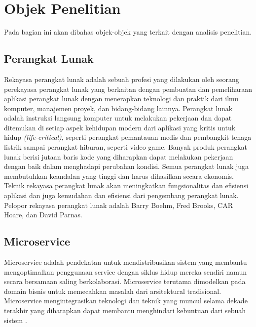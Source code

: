 \section{Objek Penelitian}
Pada bagian ini akan dibahas objek-objek yang terkait dengan analisis penelitian.
\subsection{Perangkat Lunak}
Rekayasa perangkat lunak adalah sebuah profesi yang dilakukan oleh seorang perekayasa perangkat lunak yang berkaitan dengan pembuatan dan pemeliharaan aplikasi perangkat lunak dengan menerapkan teknologi dan praktik dari ilmu komputer, manajemen proyek, dan bidang-bidang lainnya. Perangkat lunak adalah instruksi langsung komputer untuk melakukan pekerjaan dan dapat ditemukan di setiap aspek kehidupan modern dari aplikasi yang kritis untuk hidup \textit{(life-critical)}, seperti perangkat pemantauan medis dan pembangkit tenaga listrik sampai perangkat hiburan, seperti video game. Banyak produk perangkat lunak berisi jutaan baris kode yang diharapkan dapat melakukan pekerjaan dengan baik dalam menghadapi perubahan kondisi. Semua perangkat lunak juga membutuhkan keandalan yang tinggi dan harus dihasilkan secara ekonomis. Teknik rekayasa perangkat lunak akan meningkatkan fungsionalitas dan efisiensi aplikasi dan juga kemudahan dan efisiensi dari pengembang perangkat lunak. Pelopor rekayasa perangkat lunak adalah Barry Boehm, Fred Brooks, CAR Hoare, dan David Parnas. \cite{14}

\subsection{Microservice}
Microservice adalah pendekatan untuk mendistribusikan sistem yang membantu mengoptimalkan penggunaan service dengan siklus hidup mereka sendiri namun secara bersamaan saling berkolaborasi. Microservice terutama dimodelkan pada domain bisnis untuk memecahkan masalah dari arsitektural tradisional. Microservice mengintegrasikan teknologi dan teknik yang muncul selama dekade terakhir yang diharapkan dapat membantu menghindari kebuntuan dari sebuah sistem \cite{9}.
\newpage